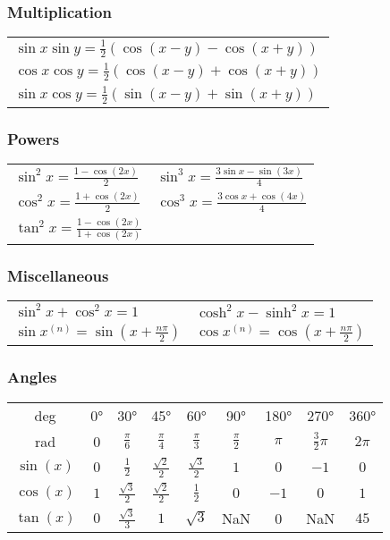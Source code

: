 \documentclass[a4paper, 10pt]{article}
\theoremstyle{definition}
\theoremstyle{named}
\begin{document}
\subsubsection*{Multiplication}
\begin{tabularx}{\linewidth}{X}
    $\sin x \sin y = \frac{1}{2}(\cos(x - y) - \cos(x + y))$ \\
    $\cos x \cos y = \frac{1}{2}(\cos(x - y) + \cos(x + y))$ \\
    $\sin x \cos y = \frac{1}{2}(\sin(x - y) + \sin(x + y))$ \\
\end{tabularx}

\subsubsection*{Powers}
\begin{tabularx}{\linewidth}{XX}
    $\sin^2 x = \frac{1 - \cos(2x)}{2}$ & $\sin^3 x = \frac{3 \sin x - \sin(3x)}{4}$ \\
    $\cos^2 x = \frac{1 + \cos(2x)}{2}$ & $\cos^3 x = \frac{3 \cos x + \cos(4x)}{4}$ \\
    $\tan^2 x = \frac{1 - \cos(2x)}{1 + \cos(2x)}$
\end{tabularx}

\subsubsection*{Miscellaneous}
\begin{tabularx}{\linewidth}{XX}
    $\sin^2 x + \cos^2 x = 1$ & $\cosh^2 x - \sinh^2 x = 1$ \\
    $\sin x^{(n)} = \sin\left(x + \frac{n \pi}{2}\right)$ & $\cos x^{(n)} = \cos\left(x + \frac{n \pi}{2}\right)$
\end{tabularx}

\subsubsection*{Angles}
\begin{tabularx}{\linewidth}{c|cccccccc}
    deg & 0° & 30° & 45° & 60° & 90° & 180° & 270° & 360° \\
    rad & 0 & $\frac{\pi}{6}$ & $\frac{\pi}{4}$ & $\frac{\pi}{3}$ & $\frac{\pi}{2}$ & $\pi$ & $\frac{3}{2}\pi$ & $2\pi$ \\
    \midrule
    $\sin(x)$ & $0$ & $\frac{1}{2}$ & $\frac{\sqrt{2}}{2}$ & $\frac{\sqrt{3}}{2}$ & $1$ & $0$ & $-1$ & $0$ \\
    $\cos(x)$ & $1$ & $\frac{\sqrt{3}}{2}$ & $\frac{\sqrt{2}}{2}$ & $\frac{1}{2}$ & $0$ & $-1$ & $0$ & $1$ \\
    $\tan(x)$ & $0$ & $\frac{\sqrt{3}}{3}$ & $1$ & $\sqrt{3}$ & NaN & 0 & NaN & $45$
\end{tabularx}
\end{document}
